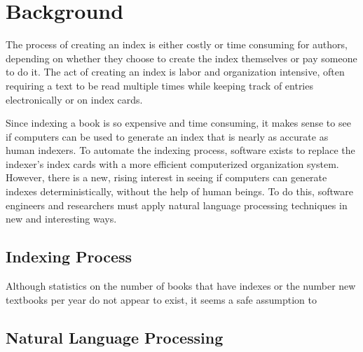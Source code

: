 \section{Background}
The process of creating an index is either costly or time consuming for authors, depending on whether they choose to create the index themselves or pay someone to do it.
The act of creating an index is labor and organization intensive, often requiring a text to be read multiple times while keeping track of entries electronically or on index cards.

Since indexing a book is so expensive and time consuming, it makes sense to see if computers can be used to generate an index that is nearly as accurate as human indexers.
To automate the indexing process, software exists to replace the indexer's index cards with a more efficient computerized organization system.
However, there is a new, rising interest in seeing if computers can generate indexes deterministically, without the help of human beings.
To do this, software engineers and researchers must apply natural language processing techniques in new and interesting ways.

\subsection{Indexing Process}


Although statistics on the number of books that have indexes or the number new textbooks per year do not appear to exist, it seems a safe assumption to 

\subsection{Natural Language Processing}